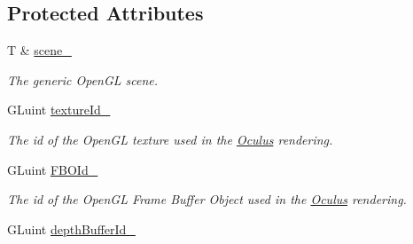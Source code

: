 \subsection*{Protected Attributes}
\begin{DoxyCompactItemize}
\item 
T \& \hyperlink{classOculus_a8a88e3b8bb25831c6fb001fbdac6b45b}{scene\+\_\+}
\begin{DoxyCompactList}\small\item\em The generic Open\+G\+L scene. \end{DoxyCompactList}\item 
\hypertarget{classOculus_a5e97a6716ef4b94b87eb2a0452e32eb4}{}G\+Luint \hyperlink{classOculus_a5e97a6716ef4b94b87eb2a0452e32eb4}{texture\+Id\+\_\+}\label{classOculus_a5e97a6716ef4b94b87eb2a0452e32eb4}

\begin{DoxyCompactList}\small\item\em The id of the Open\+G\+L texture used in the \hyperlink{classOculus}{Oculus} rendering. \end{DoxyCompactList}\item 
\hypertarget{classOculus_a3918541266c72f1bb3f84225edc37e95}{}G\+Luint \hyperlink{classOculus_a3918541266c72f1bb3f84225edc37e95}{F\+B\+O\+Id\+\_\+}\label{classOculus_a3918541266c72f1bb3f84225edc37e95}

\begin{DoxyCompactList}\small\item\em The id of the Open\+G\+L Frame Buffer Object used in the \hyperlink{classOculus}{Oculus} rendering. \end{DoxyCompactList}\item 
\hypertarget{classOculus_a420de1ed9815712680893b1a61d90dfc}{}G\+Luint \hyperlink{classOculus_a420de1ed9815712680893b1a61d90dfc}{depth\+Buffer\+Id\+\_\+}\label{classOculus_a420de1ed9815712680893b1a61d90dfc}


\end{DoxyCompactItemize}
